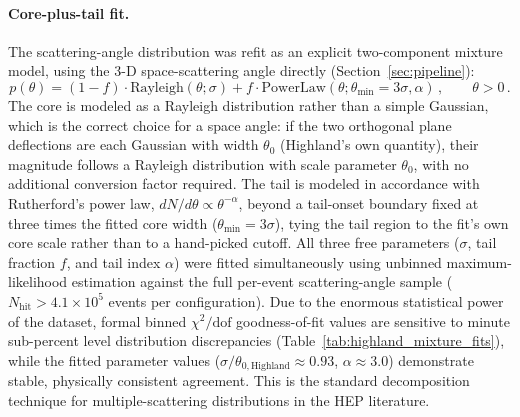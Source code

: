 \documentclass[a4paper,11pt]{article}
\begin{document}
\paragraph{Core-plus-tail fit.} The scattering-angle distribution was refit as an explicit two-component mixture model, using the 3-D space-scattering angle directly (Section~\ref{sec:pipeline}):
\begin{equation}
\label{eq:core_tail_mixture}
p(\theta) = (1 - f) \cdot \mathrm{Rayleigh}(\theta; \sigma) + f \cdot \mathrm{PowerLaw}(\theta; \theta_{\min} = 3\sigma, \alpha)\,, \qquad \theta > 0\,.
\end{equation}
The core is modeled as a Rayleigh distribution rather than a simple Gaussian, which is the correct choice for a space angle: if the two orthogonal plane deflections are each Gaussian with width $\theta_0$ (Highland's own quantity), their magnitude follows a Rayleigh distribution with scale parameter $\theta_0$, with no additional conversion factor required. The tail is modeled in accordance with Rutherford's power law, $dN/d\theta \propto \theta^{-\alpha}$, beyond a tail-onset boundary fixed at three times the fitted core width ($\theta_{\min} = 3\sigma$), tying the tail region to the fit's own core scale rather than to a hand-picked cutoff. All three free parameters ($\sigma$, tail fraction $f$, and tail index $\alpha$) were fitted simultaneously using unbinned maximum-likelihood estimation against the full per-event scattering-angle sample ($N_{\text{hit}} > 4.1 \times 10^5$ events per configuration). Due to the enormous statistical power of the dataset, formal binned $\chi^2/\text{dof}$ goodness-of-fit values are sensitive to minute sub-percent level distribution discrepancies (Table~\ref{tab:highland_mixture_fits}), while the fitted parameter values ($\sigma/\theta_{0,\text{Highland}} \approx 0.93$, $\alpha \approx 3.0$) demonstrate stable, physically consistent agreement. This is the standard decomposition technique for multiple-scattering distributions in the HEP literature.
\end{document}
